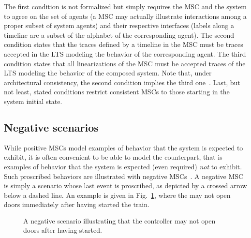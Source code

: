 The first condition is not formalized but simply requires the MSC and the system to agree on the set of agents (a MSC may actually illustrate interactions among a proper subset of system agents) and their respective interfaces (labels along a timeline are a subset of the alphabet of the corresponding agent). The second condition states that the traces defined by a timeline in the MSC must be traces accepted in the LTS modeling the behavior of the corresponding agent. The third condition states that all linearizations of the MSC must be accepted traces of the LTS modeling the behavior of the composed system. Note that, under architectural consistency, the second condition implies the third one~\cite{Uchitel:2003}. Last, but not least, stated conditions restrict consistent MSCs to those starting in the system initial state.

\subsection{Negative scenarios}

While positive MSCs model examples of behavior that the system is expected to exhibit, it is often convenient to be able to model the counterpart, that is examples of behavior that the system is expected (even required) \emph{not} to exhibit. Such proscribed behaviors are illustrated with negative MSCs~\cite{Uchitel:2004}. A negative MSC is simply a scenario whose last event is proscribed, as depicted by a crossed arrow below a dashed line. An example is given in Fig.~\ref{image:train-negative-scenario}, where the  may not open doors immediately after having started the train.

\vspace{0.4cm}
\begin{figure}\centering
{}
\caption{A negative scenario illustrating that the controller may not open doors after having started.\label{image:train-negative-scenario}}
\end{figure}

